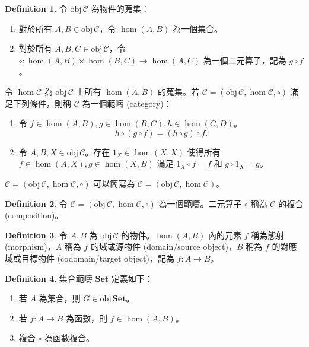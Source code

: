 \documentclass[12pt]{article}
\theoremstyle{definition}
\newtheorem{definition}{Definition}[section]
\newcommand\<{\langle}
\renewcommand\>{\rangle}
\newcommand\obj{\mathrm{obj}\hspace{2pt}}
\begin{document}
\begin{CJK}{UTF8}{bsmi}
\begin{definition}
    令 $\obj\mathcal{C}$ 為物件的蒐集：
    \begin{enumerate}
        \item 對於所有 $A, B\in\obj\mathcal{C}$，令 $\hom(A, B)$ 為一個集合。
        \item 對於所有 $A, B, C\in\obj\mathcal{C}$，令 $\circ:\hom(A, B)\times\hom(B, C)\to\hom(A, C)$ 為一個二元算子，記為 $g\circ f$。
    \end{enumerate}
    令 $\hom\mathcal{C}$ 為 $\obj\mathcal{C}$ 上所有 $\hom(A, B)$ 的蒐集。若 $\mathcal{C}=(\obj\mathcal{C}, \hom\mathcal{C}, \circ)$ 滿足下列條件，則稱 $\mathcal{C}$ 為一個範疇 (category)：
    \begin{enumerate}
        \item 令 $f\in\hom(A, B), g\in\hom(B, C), h\in\hom(C, D)$。
        \[
            h\circ(g\circ f)=(h\circ g)\circ f.
        \]
        \item 令 $A, B, X\in\obj\mathcal{C}$。存在 $1_X\in\hom(X, X)$ 使得所有 $f\in\hom(A, X), g\in\hom(X, B)$ 滿足 $1_X\circ f=f$ 和 $g\circ 1_X=g$。
    \end{enumerate}
\end{definition}

$\mathcal{C}=(\obj\mathcal{C}, \hom\mathcal{C}, \circ)$ 可以簡寫為 $\mathcal{C}=(\obj\mathcal{C}, \hom\mathcal{C})$。

\begin{definition}
    令 $\mathcal{C}=(\obj\mathcal{C}, \hom\mathcal{C}, \circ)$ 為一個範疇。二元算子 $\circ$ 稱為 $\mathcal{C}$ 的複合 (composition)。
\end{definition}

\begin{definition}
    令 $A, B$ 為 $\obj\mathcal{C}$ 的物件。$\hom(A, B)$ 內的元素 $f$ 稱為態射 (morphism)，$A$ 稱為 $f$ 的域或源物件 (domain/source object)，$B$ 稱為 $f$ 的對應域或目標物件 (codomain/target object)，記為 $f:A\to B$。
\end{definition}

\begin{definition}
    集合範疇 $\textbf{Set}$ 定義如下：
    \begin{enumerate}
        \item 若 $A$ 為集合，則 $G\in\obj\textbf{Set}$。
        \item 若 $f:A\to B$ 為函數，則 $f\in\hom(A, B)$。
        \item 複合 $\circ$ 為函數複合。
    \end{enumerate}
\end{definition}


\end{CJK}
\end{document}
